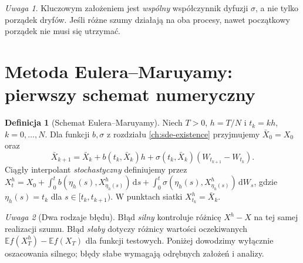 \documentclass[11pt,a4paper,oneside]{report}
\numberwithin{equation}{chapter}
\theoremstyle{plain}
\theoremstyle{definition}
\newtheorem{definicja}{Definicja}[chapter]
\theoremstyle{remark}
\newtheorem{uwaga}{Uwaga}[chapter]
\newcommand{\E}{\mathbb{E}}
\newcommand{\dd}{\mathrm{d}}
\begin{document}
\begin{uwaga}
Kluczowym założeniem jest \emph{wspólny} współczynnik
dyfuzji $\sigma$, a nie tylko porządek dryfów.
Jeśli różne szumy działają na oba procesy, nawet
początkowy porządek nie musi się utrzymać.
\end{uwaga}

\section{Metoda Eulera--Maruyamy: pierwszy schemat numeryczny}
\begin{definicja}[Schemat Eulera--Maruyamy]
\label{def:em}
Niech $T>0$, $h=T/N$ i $t_k=kh$, $k=0,\ldots,N$.
Dla funkcji $b,\sigma$ z rozdziału
\ref{ch:sde-existence} przyjmujemy
$\bar X_0=X_0$ oraz
\[
\bar X_{k+1}=\bar X_k+b(t_k,\bar X_k)h
+\sigma(t_k,\bar X_k)(W_{t_{k+1}}-W_{t_k}).
\tag{6.11}\label{eq:em}
\]
Ciągły interpolant \emph{stochastyczny} definiujemy
przez $X_t^h=X_0+\int_0^t b(\eta_h(s),X^h_{\eta_h(s)})\,\dd s
+\int_0^t\sigma(\eta_h(s),X^h_{\eta_h(s)})\,\dd W_s$,
gdzie $\eta_h(s)=t_k$ dla $s\in[t_k,t_{k+1})$.
W punktach siatki $X_{t_k}^h=\bar X_k$.
\end{definicja}

\begin{uwaga}[Dwa rodzaje błędu]
Błąd \emph{silny} kontroluje różnicę $X^h-X$
na tej samej realizacji szumu. Błąd \emph{słaby}
dotyczy różnicy wartości oczekiwanych
$\E f(X_T^h)-\E f(X_T)$ dla funkcji testowych.
Poniżej dowodzimy wyłącznie oszacowania silnego;
błędy słabe wymagają odrębnych założeń i analizy.
\end{uwaga}
\end{document}
